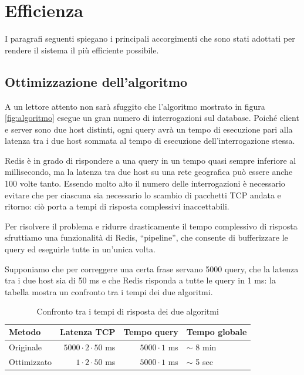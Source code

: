 \pagebreak

\section{Efficienza}
I paragrafi seguenti spiegano i principali accorgimenti che sono stati adottati per rendere il sistema il più efficiente possibile.

\subsection{Ottimizzazione dell'algoritmo}
A un lettore attento non sarà sfuggito che l'algoritmo mostrato in figura \ref{fig:algoritmo} esegue un gran numero di interrogazioni sul database. Poiché client e server sono due host distinti, ogni query avrà un tempo di esecuzione pari alla latenza tra i due host sommata al tempo di esecuzione dell'interrogazione stessa. 

Redis è in grado di rispondere a una query in un tempo quasi sempre inferiore al millisecondo, ma la latenza tra due host su una rete geografica può essere anche 100 volte tanto. Essendo molto alto il numero delle interrogazioni è necessario evitare che per ciascuna sia necessario lo scambio di pacchetti TCP andata e ritorno: ciò porta a tempi di risposta complessivi inaccettabili.

Per risolvere il problema e ridurre drasticamente il tempo complessivo di risposta sfruttiamo una funzionalità di Redis, ``pipeline'', che consente di bufferizzare le query ed eseguirle tutte in un'unica volta.

Supponiamo che per correggere una certa frase servano 5000 query, che la latenza tra i due host sia di 50 ms e che Redis risponda a tutte le query in 1 ms: la tabella mostra un confronto tra i tempi dei due algoritmi.
\begin{table}[h]
\centering
\begin{tabular}{lrrl}
\toprule
Metodo		&	Latenza TCP					&	Tempo query		&	Tempo globale	\\
\midrule
Originale	&	$5000 \cdot 2 \cdot 50$ ms& $5000 \cdot 1$ ms	&	$\sim$ 8 min		\\
Ottimizzato	&	$1 \cdot 2 \cdot 50$ ms		& $5000 \cdot 1$ ms	&	$\sim$ 5 sec		\\
\bottomrule
\end{tabular}
\caption{Confronto tra i tempi di risposta dei due algoritmi}
\end{table}

